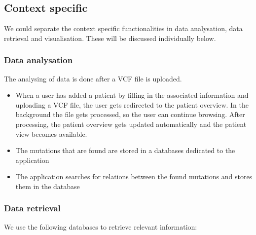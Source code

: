 \subsection{Context specific}

We could separate the context specific functionalities in data analysation, data retrieval and visualisation. These will be discussed individually below.

\subsubsection{Data analysation}

The analysing of data is done after a VCF file is uploaded.

\begin{itemize}
  \item When a user has added a patient by filling in the associated information and uploading a VCF file, the user gets redirected to the patient overview. In the background the file gets processed, so the user can continue browsing. After processing, the patient overview gets updated automatically and the patient view becomes available.
  \item The mutations that are found are stored in a databases dedicated to the application
  \item The application searches for relations between the found mutations and stores them in the database
\end{itemize}

\subsubsection{Data retrieval}

We use the following databases to retrieve relevant information:


